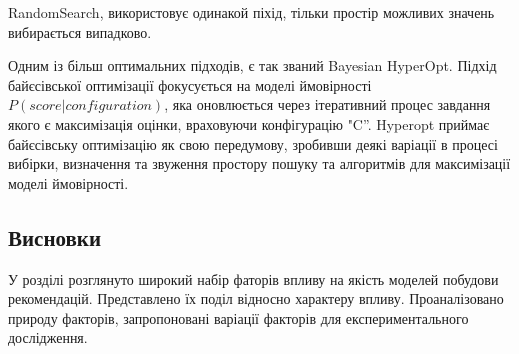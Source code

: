 RandomSearch, використовує одинакой піхід, тільки простір можливих значень вибирається випадково. 

Одним із більш оптимальних підходів, є так званий Bayesian HyperOpt.
Підхід байєсівської оптимізації фокусується на моделі ймовірності $P(score| configuration)$, яка оновлюється через ітеративний процес завдання якого є максимізація оцінки, враховуючи конфігурацію "C”. Hyperopt приймає байєсівську оптимізацію як свою передумову, зробивши деякі варіації в процесі вибірки, визначення та звуження простору пошуку та алгоритмів для максимізації моделі ймовірності.
\subsection*{Висновки}

У розділі розглянуто широкий набір фаторів впливу на якість моделей побудови рекомендацій. Представлено їх поділ відносно характеру впливу. Проаналізовано природу факторів, запропоновані варіації факторів для експериментального дослідження.